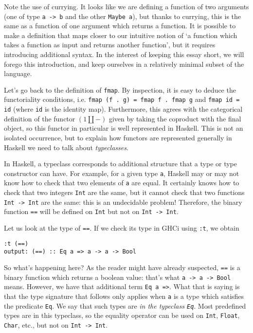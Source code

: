 \documentclass[11pt]{article}
\theoremstyle{nonumberplain}
\newcommand{\blank}{{-}}
\newcommand*\lsin{\lstinline}
\begin{document}
Note the use of currying. It looks like we are defining a function of two arguments (one of type \lsin|a -> b| and the other \lsin|Maybe a|), but thanks to currying, this is the same as a function of one argument which returns a function. It is possible to make a definition that maps closer to our intuitive notion of `a function which takes a function as input and returns another function', but it requires introducing additional syntax. In the interest of keeping this essay short, we will forego this introduction, and keep ourselves in a relatively minimal subset of the language.

Let's go back to the definition of \lsin|fmap|. By inspection, it is easy to deduce the functoriality conditions, i.e. \lsin|fmap (f . g) = fmap f . fmap g| and \lsin|fmap id = id| (where \lsin|id| is the identity map). Furthermore, this agrees with the categorical definition of the functor $(1 \amalg \blank)$ given by taking the coproduct with the final object, so this functor in particular is well represented in Haskell. This is not an isolated occurrence, but to explain how functors are represented generally in Haskell we need to talk about \emph{typeclasses}.

In Haskell, a typeclass corresponds to additional structure that a type or type constructor can have. For example, for a given type \lsin|a|, Haskell may or may not know how to check that two elements of \lsin|a| are equal. It certainly knows how to check that two integers \lsin|Int| are the same, but it cannot check that two functions \lsin|Int -> Int| are the same: this is an undecidable problem! Therefore, the binary function \lsin|==| will be defined on \lsin|Int| but not on \lsin|Int -> Int|.

Let us look at the type of \lsin|==|. If we check its type in GHCi using \lsin|:t|, we obtain
\begin{lstlisting}
:t (==)
output: (==) :: Eq a => a -> a -> Bool
\end{lstlisting}

So what's happening here? As the reader might have already suspected, \lsin|==| is a binary function which returns a boolean value: that's what \lsin|a -> a -> Bool| means. However, we have that additional term \lsin|Eq a =>|. What that is saying is that the type signature that follows only applies when \lsin|a| is a type which satisfies the predicate \lsin|Eq|. We say that such types are \emph{in the typeclass \lsin|Eq|}. Most predefined types are in this typeclass, so the equality operator can be used on \lsin|Int|, \lsin|Float|, \lsin|Char|, etc., but not on \lsin|Int -> Int|.
\end{document}
